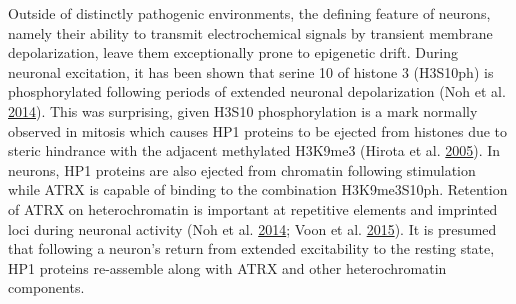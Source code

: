 \documentclass[onehalf,12pt]{beavtex}
\begin{document}
  Outside of distinctly pathogenic environments, the defining feature of
  neurons, namely their ability to transmit electrochemical signals by
  transient membrane depolarization, leave them exceptionally prone to
  epigenetic drift. During neuronal excitation, it has been shown that
  serine 10 of histone 3 (H3S10ph) is phosphorylated following periods of
  extended neuronal depolarization (Noh et al.
  \protect\hyperlink{ref-NohATRXtoleratesactivitydependent2014}{2014}).
  This was surprising, given H3S10 phosphorylation is a mark normally
  observed in mitosis which causes HP1 proteins to be ejected from
  histones due to steric hindrance with the adjacent methylated H3K9me3
  (Hirota et al. \protect\hyperlink{ref-HirotaHistoneH3serine2005}{2005}).
  In neurons, HP1 proteins are also ejected from chromatin following
  stimulation while ATRX is capable of binding to the combination
  H3K9me3S10ph. Retention of ATRX on heterochromatin is important at
  repetitive elements and imprinted loci during neuronal activity (Noh et
  al. \protect\hyperlink{ref-NohATRXtoleratesactivitydependent2014}{2014};
  Voon et al. \protect\hyperlink{ref-VoonATRXplayskey2015}{2015}). It is
  presumed that following a neuron's return from extended excitability to
  the resting state, HP1 proteins re-assemble along with ATRX and other
  heterochromatin components.
  
\end{document}
